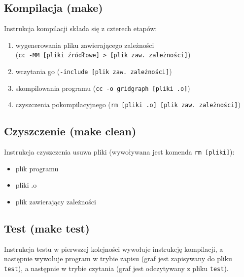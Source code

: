 \documentclass[11pt,a4paper]{report}
\begin{document}
    \subsection{Kompilacja (make)}
    Instrukcja kompilacji składa się z czterech etapów:
    \begin{enumerate}
        \item wygenerowania pliku zawierającego zależności\\
              (\verb|cc -MM [pliki źródłowe] > [plik zaw. zależności]|)
        \item wczytania go (\verb|-include [plik zaw. zależności]|)
        \item skompilowania programu (\verb|cc -o gridgraph [pliki .o]|)
        \item czyszczenia pokompilacyjnego (\verb|rm [pliki .o] [plik zaw. zależności]|)
    \end{enumerate}
    \subsection{Czyszczenie (make clean)}
    Instrukcja czyszczenia usuwa pliki (wywoływana jest komenda \verb|rm [pliki]|):
    \begin{itemize}
        \item plik programu
        \item pliki .o
        \item plik zawierający zależności
    \end{itemize}
    \subsection{Test (make test)}
    Instrukcja testu w pierwszej kolejności wywołuje instrukcję kompilacji, a następnie wywołuje program w trybie zapisu (graf jest zapisywany do pliku \verb|test|), a następnie w trybie czytania (graf jest odczytywany z pliku \verb|test|).
\end{document}
